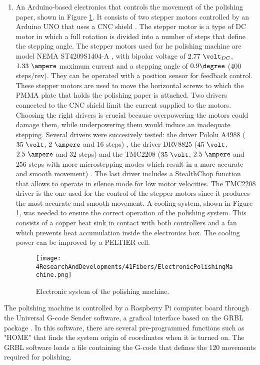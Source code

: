 \begin{enumerate}
\item{} An Arduino-based electronics that controls the movement of the polishing paper, shown in Figure \ref{fig:ElectronicSystemPolishingMachine}. It consists of two stepper motors controlled by an Arduino UNO \cite{ArduinoUNO} that uses a CNC shield \cite{CNCShield}. The stepper motor is a type of DC motor in which a full rotation is divided into a number of steps that define the stepping angle. The stepper motors used for he polishing machine are model NEMA ST4209S1404-A \cite{StepperMotors}, with bipolar voltage of $2.77~\volt_{DC}$, $1.33~\ampere$ maximum current and a stepping angle of $0.9\degree$ ($400$ steps/rev). They can be operated with a position sensor for feedback control. These stepper motors are used to move the horizontal screws to which the PMMA plate that holds the polishing paper is attached. Two drivers connected to the CNC shield limit the current supplied to the motors. Choosing the right drivers is crucial because overpowering the motors could damage them, while underpowering them would induce an inadequate stepping. Several drivers were succesively tested: the driver Pololu A4988 ($35~\volt$, $2~\ampere$ and $16$ steps) \cite{A4988Driver}, the driver DRV8825 ($45~\volt$, $2.5~\ampere$ and $32$ steps) \cite{DRV8825Driver} and the TMC2208 ($35~\volt$, $2.5~\ampere$ and $256$ steps with more microstepping modes which result in a more accurate and smooth movement) \cite{TMC2208Driver}. The last driver includes a StealthChop function that allows to operate in silence mode for low motor velocities. The TMC2208 driver is the one used for the control of the stepper motors since it produces the most accurate and smooth movement. A cooling system, shown in Figure \ref{fig:ElectronicSystemPolishingMachine}, was needed to ensure the correct operation of the polishing system. This consists of a copper heat sink in contact with both controllers and a fan which prevents heat accumulation inside the electronics box. The cooling power can be improved by a PELTIER cell.

\begin{figure}[h]
\centering
\texttt{[image: 4ResearchAndDevelopments/41Fibers/ElectronicPolishingMachine.png]}
\caption{Electronic system of the polishing machine.\label{fig:ElectronicSystemPolishingMachine}}
\end{figure}
\end{enumerate}

The polishing machine is controlled by a Raspberry Pi computer board \cite{RaspberryPi} through the Universal G-code Sender software, a grafical interface based on the GRBL package \cite{GRBLDocumentation}. In this software, there are several pre-programmed functions such as "HOME" that finds the system origin of coordinates when it is turned on. The GRBL software loads a file containing the G-code that defines the 120 movements required for polishing.

